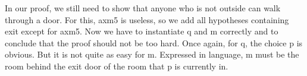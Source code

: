 In our proof, we still need to show that anyone who is not \textsf{outside} can walk through a door. For this, \textsf{axm5} is useless, so we add all hypotheses containing exit except for \textsf{axm5}. Now we have to instantiate \textsf{q} and \textsf{m} correctly and to conclude that the proof should not be too hard. Once again, for \textsf{q}, the choice \textsf{p} is obvious. But it is not quite as easy for \textsf{m}. Expressed in language, \textsf{m} must be the room behind the exit door of the room that \textsf{p} is currently in. 

